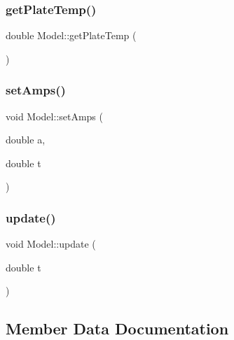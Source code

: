 \mbox{\label{class_model_a5aea080a5b4ca3283401ed1ef761d219}} 
\subsubsection{\texorpdfstring{get\+Plate\+Temp()}{getPlateTemp()}}
{\footnotesize\ttfamily double Model\+::get\+Plate\+Temp (\begin{DoxyParamCaption}{ }\end{DoxyParamCaption})}

\mbox{\label{class_model_a38da3e25e7d135712c94e1274cd4389c}} 
\subsubsection{\texorpdfstring{set\+Amps()}{setAmps()}}
{\footnotesize\ttfamily void Model\+::set\+Amps (\begin{DoxyParamCaption}\item[{double}]{a,  }\item[{double}]{t }\end{DoxyParamCaption})}

\mbox{\label{class_model_a30a27a8a0abd98981f23815037f1cd5a}} 
\subsubsection{\texorpdfstring{update()}{update()}}
{\footnotesize\ttfamily void Model\+::update (\begin{DoxyParamCaption}\item[{double}]{t }\end{DoxyParamCaption})}



\subsection{Member Data Documentation}
\mbox{\label{class_model_aca9e1c3383fa4fdd1107a0ad6432e7ee}} 
